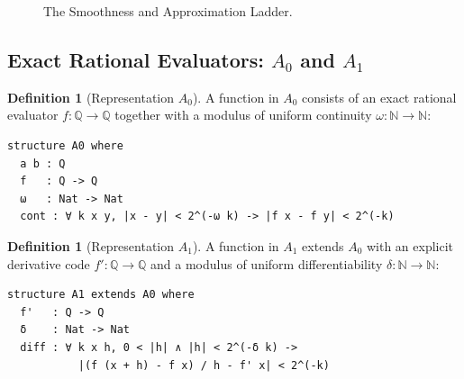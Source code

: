 \documentclass[11pt,a4paper]{article}
\theoremstyle{definition}
\newtheorem{definition}[theorem]{Definition}
\theoremstyle{remark}
\newcommand{\Q}{\ensuremath{\mathbb{Q}}}
\newcommand{\N}{\ensuremath{\mathbb{N}}}
\begin{document}
\begin{figure}[htbp]
\centering
{}
\caption{The Smoothness and Approximation Ladder.}
\end{figure}

\subsection{Exact Rational Evaluators: $A_0$ and $A_1$}
\begin{definition}[Representation $A_0$]
A function in $A_0$ consists of an exact rational evaluator $f : \Q \to \Q$ together with a modulus of uniform continuity $\omega : \N \to \N$:
\begin{lstlisting}[language=Lean]
structure A0 where
  a b : Q
  f   : Q -> Q
  ω   : Nat -> Nat
  cont : ∀ k x y, |x - y| < 2^(-ω k) -> |f x - f y| < 2^(-k)
\end{lstlisting}
\end{definition}

\begin{definition}[Representation $A_1$]
A function in $A_1$ extends $A_0$ with an explicit derivative code $f' : \Q \to \Q$ and a modulus of uniform differentiability $\delta : \N \to \N$:
\begin{lstlisting}[language=Lean]
structure A1 extends A0 where
  f'   : Q -> Q
  δ    : Nat -> Nat
  diff : ∀ k x h, 0 < |h| ∧ |h| < 2^(-δ k) -> 
           |(f (x + h) - f x) / h - f' x| < 2^(-k)
\end{lstlisting}
\end{definition}
\end{document}
